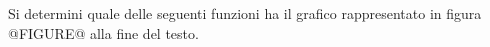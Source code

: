 Si determini quale delle seguenti funzioni ha il grafico rappresentato in figura
@FIGURE@ alla fine del testo. 
